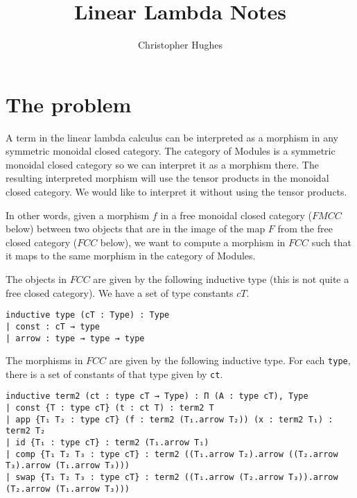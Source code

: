 \documentclass[12pt]{article} %
\title{Linear Lambda Notes}
\author{Christopher Hughes}
\theoremstyle{definition}
\theoremstyle{definition}
\theoremstyle{definition}
\theoremstyle{definition}
\begin{document}
\section{The problem}

A term in the linear lambda calculus can be interpreted as a morphism in any 
symmetric monoidal closed category. The category of Modules is a symmetric monoidal
closed category so we can interpret it as a morphism there. The resulting interpreted morphism will 
use the tensor products in the monoidal closed category. We would like to interpret
it without using the tensor products.

In other words, given a morphism $f$ in a free monoidal closed category ($FMCC$ below) between two objects that are 
in the image of the map $F$ from the free closed category ($FCC$ below), we want to compute a morphism in $FCC$
such that it maps to the same morphism in the category of Modules.


The objects in $FCC$ are given by the following inductive type (this is not quite a free closed category).
We have a set of type constants $cT$.

\begin{lstlisting}
inductive type (cT : Type) : Type
| const : cT → type
| arrow : type → type → type
\end{lstlisting}

The morphisms in $FCC$ are given by the following inductive type. For each \lstinline{type}, there is a set of
constants of that type given by \lstinline{ct}.

\begin{lstlisting}
inductive term2 (ct : type cT → Type) : Π (A : type cT), Type
| const {T : type cT} (t : ct T) : term2 T
| app {T₁ T₂ : type cT} (f : term2 (T₁.arrow T₂)) (x : term2 T₁) : term2 T₂
| id {T₁ : type cT} : term2 (T₁.arrow T₁)
| comp {T₁ T₂ T₃ : type cT} : term2 ((T₁.arrow T₂).arrow ((T₂.arrow T₃).arrow (T₁.arrow T₃)))
| swap {T₁ T₂ T₃ : type cT} : term2 ((T₁.arrow (T₂.arrow T₃)).arrow (T₂.arrow (T₁.arrow T₃)))
\end{lstlisting}
\end{document}
